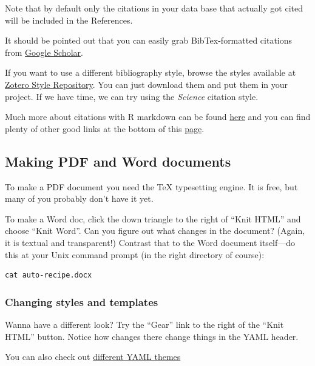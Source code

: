 \documentclass[
]{article}
\begin{document}
Note that by default only the citations in your data base that actually
got cited will be included in the References.

It should be pointed out that you can easily grab BibTex-formatted
citations from \href{http://scholar.google.com}{Google Scholar}.

If you want to use a different bibliography style, browse the styles
available at \href{https://zotero.org/styles}{Zotero Style Repository}.
You can just download them and put them in your project. If we have
time, we can try using the \emph{Science} citation style.

Much more about citations with R markdown can be found
\href{http://rmarkdown.rstudio.com/authoring_bibliographies_and_citations.html}{here}
and you can find plenty of other good links at the bottom of this
\href{http://rmarkdown.rstudio.com/}{page}.

\hypertarget{making-pdf-and-word-documents}{%
\subsection{Making PDF and Word
documents}\label{making-pdf-and-word-documents}}

To make a PDF document you need the TeX typesetting engine. It is free,
but many of you probably don't have it yet.

To make a Word doc, click the down triangle to the right of ``Knit
HTML'' and choose ``Knit Word''. Can you figure out what changes in the
document? (Again, it is textual and transparent!) Contrast that to the
Word document itself---do this at your Unix command prompt (in the right
directory of course):

\begin{verbatim}
cat auto-recipe.docx
\end{verbatim}

\hypertarget{changing-styles-and-templates}{%
\subsubsection{Changing styles and
templates}\label{changing-styles-and-templates}}

Wanna have a different look? Try the ``Gear'' link to the right of the
``Knit HTML'' button. Notice how changes there change things in the YAML
header.

You can also check out
\href{https://www.datadreaming.org/post/r-markdown-theme-gallery/}{different
YAML themes}
\end{document}
